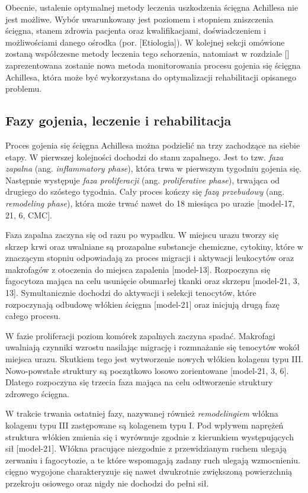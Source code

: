 Obecnie, ustalenie optymalnej metody leczenia uszkodzenia ścięgna Achillesa nie jest możliwe. Wybór uwarunkowany jest poziomem i stopniem zniszczenia ścięgna, stanem zdrowia pacjenta oraz kwalifikacjami, doświadczeniem i możliwościami danego ośrodka (por. [Etiologia]). W kolejnej sekcji omówione zostaną współczesne metody leczenia tego schorzenia, natomiast w rozdziale [] zaprezentowana zostanie nowa metoda monitorowania procesu gojenia się ścięgna Achillesa, która może być wykorzystana do optymalizacji rehabilitacji opisanego problemu. 

\subsection{Fazy gojenia, leczenie i rehabilitacja}
\label{gojenie}

Proces gojenia się ścięgna Achillesa można podzielić na trzy zachodzące na siebie etapy. W pierwszej kolejności dochodzi do stanu zapalnego. Jest to tzw. \textit{faza zapalna} (ang. \textit{inflammatory phase}), która trwa w pierwszym tygodniu gojenia się. Następnie występuje \textit{faza proliferacji} (ang. \textit{proliferative phase}), trwająca od drugiego do szóstego tygodnia. Cały proces kończy się \textit{fazą przebudowy} (ang. \textit{remodeling phase}), która może trwać nawet do 18 miesiąca po urazie [model-17, 21, 6, CMC]. 

Faza zapalna zaczyna się od razu po wypadku. W miejscu urazu tworzy się skrzep krwi oraz uwalniane są prozapalne substancje chemiczne, cytokiny, które w znaczącym stopniu odpowiadają za proces migracji i aktywacji leukocytów oraz makrofagów z otoczenia do miejsca zapalenia [model-13]. Rozpoczyna się fagocytoza mająca na celu usunięcie obumarłej tkanki oraz skrzepu [model-21, 3, 13]. Symultanicznie dochodzi do aktywacji i selekcji tenocytów, które rozpoczynają odbudowę włókien ścięgna [model-21] oraz inicjują drugą fazę całego procesu.

W fazie proliferacji poziom komórek zapalnych zaczyna spadać. Makrofagi uwalniają czynniki wzrostu nasilając migrację i rozmnażanie się tenocytów wokół miejsca urazu. Skutkiem tego jest wytworzenie nowych włókien kolagenu typu III. Nowo-powstałe struktury są początkowo losowo zorientowane [model-21, 3, 6]. Dlatego rozpoczyna się trzecia faza mająca na celu odtworzenie struktury zdrowego ścięgna.

W trakcie trwania ostatniej fazy, nazywanej również \textit{remodelingiem} włókna kolagenu typu III zastępowane są kolagenem typu I. Pod wpływem naprężeń struktura włókien zmienia się i wyrównuje zgodnie z kierunkiem występujących sił [model-21]. Włókna pracujące niezgodnie z przewidzianym ruchem ulegają zerwaniu i fagocytozie, a te które wspomagają zadany ruch ulegają wzmocnieniu. cięgno wygojone charakteryzuje się nawet dwukrotnie zwiększoną powierzchnią przekroju osiowego oraz nigdy nie dochodzi do pełni sił. 

